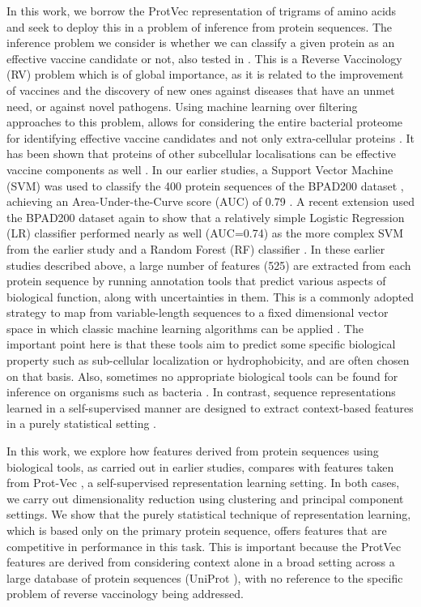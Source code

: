 \documentclass[10pt,journal,compsoc,twoside]{IEEEtran}
\begin{document}
In this work, we borrow the ProtVec representation of trigrams of amino acids and seek to deploy this in a problem of inference from protein sequences. The inference problem we consider is whether we can classify a given protein as an effective vaccine candidate or not, also tested in \cite{heinson_2017}\cite{heinson_2019} \cite{dalsass_2019}. This is a Reverse Vaccinology (RV) problem \cite{moxon_2019} \cite{vernikos_medini_2014} which is of global importance, as it is related to the improvement of vaccines and the discovery of new ones against diseases that have an unmet need, or against novel pathogens. Using machine learning over filtering approaches to this problem, allows for considering the entire bacterial proteome for identifying effective vaccine candidates and not only extra-cellular proteins \cite{vaxijen_2007} \cite{bowman_2011}. It has been shown that proteins of other subcellular localisations can be effective vaccine components as well \cite{nebenzahl_2007} \cite{fritzer_2010} \cite{henningham_2012}. In our earlier studies, a Support Vector Machine (SVM) was used to classify the 400 protein sequences of the BPAD200 dataset \cite{heinson_2017}, achieving an Area-Under-the-Curve score (AUC) of 0.79 \cite{heinson_2017}. A recent extension \cite{heinson_2019} used the BPAD200 dataset again to show that a relatively simple Logistic Regression (LR) classifier performed nearly as well (AUC=0.74) as the more complex SVM from the earlier study \cite{heinson_2017} and a Random Forest (RF) classifier \cite{heinson_2019}. In these earlier studies \cite{heinson_2017} \cite{heinson_2019} described above, a large number of features (525) are extracted from each protein sequence by running annotation tools that predict various aspects of biological function, along with uncertainties in them. This is a commonly adopted strategy to map from variable-length sequences to a fixed dimensional vector space in which classic machine learning algorithms can be applied \cite{dalsass_2019}. The important point here is that these tools aim to predict some specific biological property such as sub-cellular localization or hydrophobicity, and are often chosen on that basis. Also, sometimes no appropriate biological tools can be found for inference on organisms such as bacteria \cite{heinson_2019}. In contrast, sequence representations learned in a self-supervised manner are designed to extract context-based features in a purely statistical setting \cite{protvec}.  

In this work, we explore how features derived from protein sequences using biological tools, as carried out in earlier studies, compares with features taken from Prot-Vec \cite{protvec}, a self-supervised representation learning setting. In both cases, we carry out dimensionality reduction using clustering and principal component settings. We show that the purely statistical technique of representation learning, which is based only on the primary protein sequence, offers features that are competitive in performance in this task. This is important because the ProtVec features are derived from considering context alone in a broad setting across a large database of protein sequences (UniProt \cite{uniprot_2018}), with no reference to the specific problem of reverse vaccinology being addressed.
	
\end{document}
